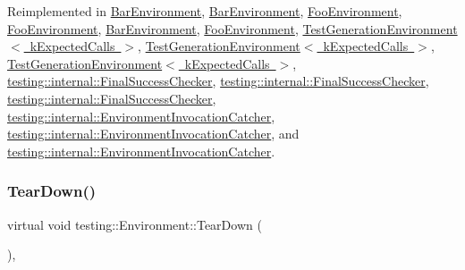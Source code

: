 Reimplemented in \mbox{\hyperlink{class_bar_environment_ac02b15d5b27e33232c578f0340442bbb}{Bar\+Environment}}, \mbox{\hyperlink{class_bar_environment_ac02b15d5b27e33232c578f0340442bbb}{Bar\+Environment}}, \mbox{\hyperlink{class_foo_environment_a68511512cce59c5b848dc23b1300dc5a}{Foo\+Environment}}, \mbox{\hyperlink{class_foo_environment_a68511512cce59c5b848dc23b1300dc5a}{Foo\+Environment}}, \mbox{\hyperlink{class_bar_environment_a384f951da72a2a18bb0c2b3506376b09}{Bar\+Environment}}, \mbox{\hyperlink{class_foo_environment_a99a2c9df52106cce9e7a4bdda53df802}{Foo\+Environment}}, \mbox{\hyperlink{class_test_generation_environment_ac3787d8afb43b97b0b3d6dec78b04798}{Test\+Generation\+Environment$<$ k\+Expected\+Calls $>$}}, \mbox{\hyperlink{class_test_generation_environment_af7731d3161d89e3bd456cd204e2c4890}{Test\+Generation\+Environment$<$ k\+Expected\+Calls $>$}}, \mbox{\hyperlink{class_test_generation_environment_af7731d3161d89e3bd456cd204e2c4890}{Test\+Generation\+Environment$<$ k\+Expected\+Calls $>$}}, \mbox{\hyperlink{classtesting_1_1internal_1_1_final_success_checker_a15ba1169b52bbf73a3ccea0c9f55cefd}{testing\+::internal\+::\+Final\+Success\+Checker}}, \mbox{\hyperlink{classtesting_1_1internal_1_1_final_success_checker_a15ba1169b52bbf73a3ccea0c9f55cefd}{testing\+::internal\+::\+Final\+Success\+Checker}}, \mbox{\hyperlink{classtesting_1_1internal_1_1_final_success_checker_a8f39d12a1f2bfe8c6c04b5c6749382c9}{testing\+::internal\+::\+Final\+Success\+Checker}}, \mbox{\hyperlink{classtesting_1_1internal_1_1_environment_invocation_catcher_a50097d7cb8997fef0e2df90a564949f0}{testing\+::internal\+::\+Environment\+Invocation\+Catcher}}, \mbox{\hyperlink{classtesting_1_1internal_1_1_environment_invocation_catcher_a50097d7cb8997fef0e2df90a564949f0}{testing\+::internal\+::\+Environment\+Invocation\+Catcher}}, and \mbox{\hyperlink{classtesting_1_1internal_1_1_environment_invocation_catcher_afc89ee0a8e32e6746a89fcc1682f62e9}{testing\+::internal\+::\+Environment\+Invocation\+Catcher}}.

\mbox{\label{classtesting_1_1_environment_a039bdaa705c46b9b88234cf4d3bb6254}} 
\subsubsection{\texorpdfstring{TearDown()}{TearDown()}\hspace{0.1cm}{\footnotesize\ttfamily [2/3]}}
{\footnotesize\ttfamily virtual void testing\+::\+Environment\+::\+Tear\+Down (\begin{DoxyParamCaption}{ }\end{DoxyParamCaption})\hspace{0.3cm}{\ttfamily [inline]}, {\ttfamily [virtual]}}



